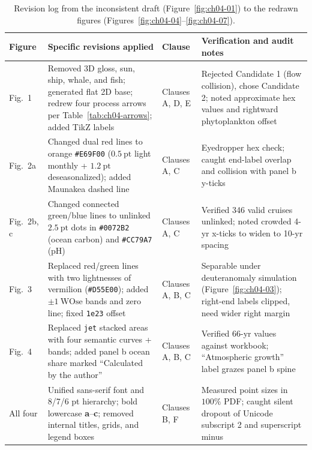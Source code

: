 \begin{table}[htbp]\centering\footnotesize
\setlength{\tabcolsep}{3pt}
\renewcommand{\arraystretch}{1.15}
\caption{Revision log from the inconsistent draft (Figure~\ref{fig:ch04-01}) to the redrawn figures (Figures~\ref{fig:ch04-04}--\ref{fig:ch04-07}).}\label{tab:ch04-revisions}
\begin{tabularx}{\linewidth}{@{}>{\raggedright\arraybackslash}p{14mm}Y>{\raggedright\arraybackslash}p{20mm}>{\raggedright\arraybackslash}p{36mm}@{}}
\toprule
\textbf{Figure} & \textbf{Specific revisions applied} & \textbf{Clause} & \textbf{Verification and audit notes} \\
\midrule
Fig.\ 1 & Removed 3D gloss, sun, ship, whale, and fish; generated flat 2D base; redrew four process arrows per Table~\ref{tab:ch04-arrows}; added TikZ labels & Clauses A, D, E & Rejected Candidate 1 (flow collision), chose Candidate 2; noted approximate hex values and rightward phytoplankton offset \\
Fig.\ 2a & Changed dual red lines to orange \texttt{\#E69F00} ($0.5\ \text{pt}$ light monthly + $1.2\ \text{pt}$ deseasonalized); added Maunakea dashed line & Clauses A, C & Eyedropper hex check; caught end-label overlap and collision with panel b y-ticks \\
Fig.\ 2b, c & Changed connected green/blue lines to unlinked $2.5\ \text{pt}$ dots in \texttt{\#0072B2} (ocean carbon) and \texttt{\#CC79A7} (pH) & Clauses A, C & Verified 346 valid cruises unlinked; noted crowded 4-yr x-ticks to widen to 10-yr spacing \\
Fig.\ 3 & Replaced red/green lines with two lightnesses of vermilion (\texttt{\#D55E00}); added $\pm 1\ \text{WOse}$ bands and zero line; fixed \texttt{1e23} offset & Clauses A, B, C & Separable under deuteranomaly simulation (Figure~\ref{fig:ch04-03}); right-end labels clipped, need wider right margin \\
Fig.\ 4 & Replaced \texttt{jet} stacked areas with four semantic curves + bands; added panel b ocean share marked ``Calculated by the author'' & Clauses A, B, C & Verified 66-yr values against workbook; ``Atmospheric growth'' label grazes panel b spine \\
All four & Unified sans-serif font and 8/7/6 pt hierarchy; bold lowercase \textbf{a}--\textbf{c}; removed internal titles, grids, and legend boxes & Clauses B, F & Measured point sizes in $100\%$ PDF; caught silent dropout of Unicode subscript 2 and superscript minus \\
\bottomrule
\end{tabularx}
\end{table}

